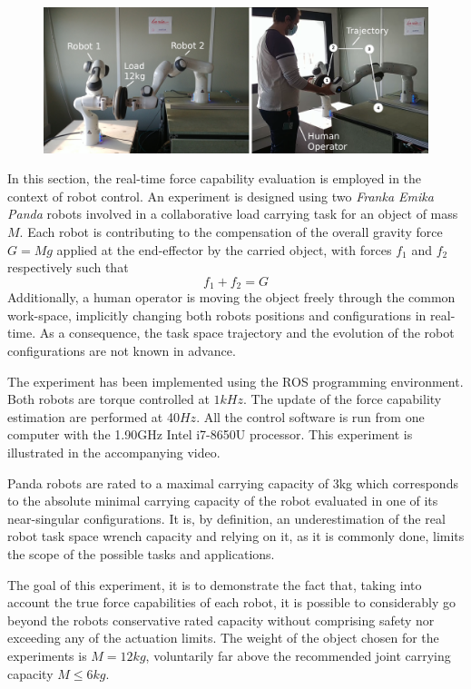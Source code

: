 \begin{figure}[!h]
    \centering
    \includegraphics[width=\linewidth]{Papers/images/exp1_explication.png}
    \caption{}
    \label{fig:experiment1}
\end{figure}


In this section, the real-time force capability evaluation is employed in the context of robot control. An experiment is designed using two \textit{Franka Emika Panda} robots involved in a collaborative load carrying task for an object of mass $M$. Each robot is contributing to the compensation of the overall gravity force $G=Mg$ applied at the end-effector by the carried object, with forces $f_1$ and $f_2$ respectively such that
\begin{equation}
    f_1 + f_2 = G
\end{equation}
Additionally, a human operator is moving the object freely through the common work-space, implicitly changing both robots positions and configurations in real-time. As a consequence, the task space trajectory and the evolution of the robot configurations are not known in advance.

The experiment has been implemented using the ROS programming environment. Both robots are torque controlled at $1 kHz$. The update of the force capability estimation are performed at 40$Hz$. All the control software is run from one computer with the 1.90GHz Intel i7-8650U processor. This experiment is illustrated in the accompanying video.

Panda robots are rated to a maximal carrying capacity of 3kg which corresponds to the absolute minimal carrying capacity of the robot evaluated in one of its near-singular configurations. It is, by definition, an underestimation of the real robot task space wrench capacity and relying on it, as it is commonly done, limits the scope of the possible tasks and applications.

The goal of this experiment, it is to demonstrate the fact that, taking into account the true force capabilities of each robot, it is possible to considerably go beyond the robots conservative rated capacity without comprising safety nor exceeding any of the actuation limits. The weight of the object chosen for the experiments is $M=12kg$, voluntarily far above the recommended joint carrying capacity $M \le 6kg$. 

